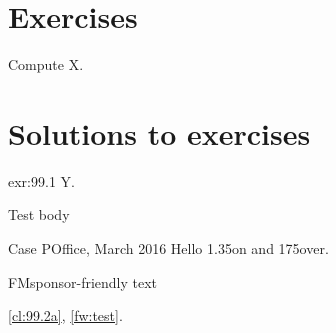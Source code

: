 \section{Exercises}\label{sec:99.2}
\begin{exercise}\label{exr:99.1} Compute X. \end{exercise}
\section{Solutions to exercises}
\begin{solution}{exr:99.1} Y. \end{solution}
\begin{framework}[label={fw:test}]{Test} body \end{framework}
\begin{casescene}{Case P}{Office, March 2016} Hello 1.35\x on and 175\bps over. \end{casescene}
\begin{clausevariants}\label{cl:99.2}
\begin{clausevariant}{FM}{sponsor-friendly}\label{cl:99.2a} text \end{clausevariant}
\end{clausevariants} \cref{cl:99.2a}, \cref{fw:test}.
